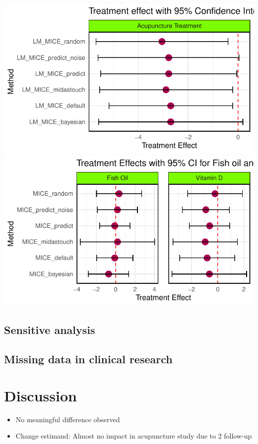 \documentclass{article}
\providecommand{\tightlist}{%
  \setlength{\itemsep}{0pt}\setlength{\parskip}{0pt}}
\newcommand{\pandocbounded}[1]{#1}
\begin{document}
\pandocbounded{\includegraphics[keepaspectratio]{Final_Report_files/figure-latex/unnamed-chunk-32-1.pdf}}
\pandocbounded{\includegraphics[keepaspectratio]{Final_Report_files/figure-latex/unnamed-chunk-32-2.pdf}}

\subsection{Sensitive analysis}\label{sensitive-analysis-1}

\subsection{Missing data in clinical
research}\label{missing-data-in-clinical-research}

\section{Discussion}\label{discussion}

\begin{itemize}
\tightlist
\item
  No meaningful difference observed
\item
  Change estimand: Almost no impact in acupuncture study due to 2
  follow-up
\end{itemize}
\end{document}
